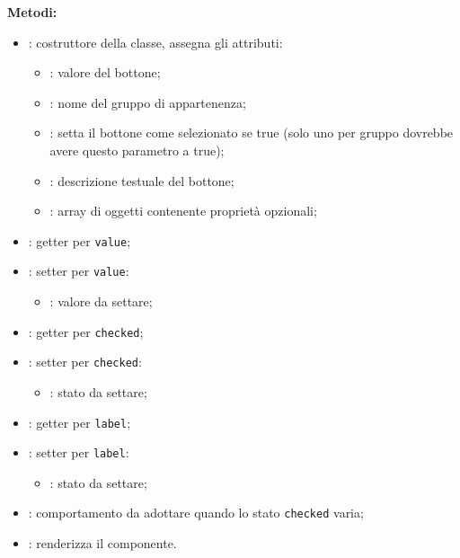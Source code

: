 \textbf{Metodi:}
\begin{itemize}
	\item {}: costruttore della classe, assegna gli attributi:
	\begin{itemize}
		\item {}: valore del bottone;
		\item {}: nome del gruppo di appartenenza;
		\item {}: setta il bottone come selezionato se true (solo uno per gruppo dovrebbe avere questo parametro a true);
		\item {}: descrizione testuale del bottone;
		\item {}: array di oggetti contenente proprietà opzionali;
	\end{itemize}
	\item {}: getter per \texttt{value};
	\item {}: setter per \texttt{value}:
	\begin{itemize}
		\item {}: valore da settare;
	\end{itemize}
	\item {}: getter per \texttt{checked};
	\item {}: setter per \texttt{checked}:
	\begin{itemize}
		\item {}: stato da settare;
	\end{itemize}
	\item {}: getter per \texttt{label};
	\item {}: setter per \texttt{label}:
	\begin{itemize}
	\item {}: stato da settare;
	\end{itemize}
	\item {}: comportamento da adottare quando lo stato \texttt{checked} varia;
	\item {}: renderizza il componente.
\end{itemize}

